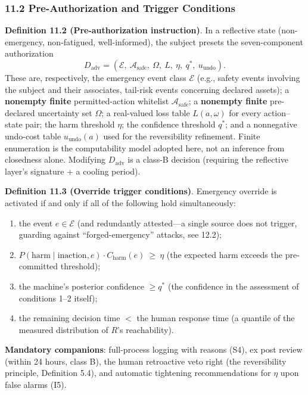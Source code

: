 \documentclass[
  11pt]{article}
\providecommand{\tightlist}{%
  \setlength{\itemsep}{0pt}\setlength{\parskip}{0pt}}
\begin{document}
\subsubsection{11.2 Pre-Authorization and Trigger
Conditions}\label{pre-authorization-and-trigger-conditions}

\textbf{Definition 11.2 (Pre-authorization instruction)}. In a
reflective state (non-emergency, non-fatigued, well-informed), the
subject presets the seven-component authorization
\[D_{\mathrm{adv}} = (\mathcal{E},\ \mathcal{A}_{\mathrm{safe}},\ \Omega,\ L,\ \eta,\ q^*,\ u_{\mathrm{undo}}).\]
These are, respectively, the emergency event class \(\mathcal{E}\)
(e.g., safety events involving the subject and their associates,
tail-risk events concerning declared assets); a \textbf{nonempty finite}
permitted-action whitelist \(\mathcal{A}_{\mathrm{safe}}\); a
\textbf{nonempty finite} pre-declared uncertainty set \(\Omega\); a
real-valued loss table \(L(a,\omega)\) for every action--state pair; the
harm threshold \(\eta\); the confidence threshold \(q^*\); and a
nonnegative undo-cost table \(u_{\mathrm{undo}}(a)\) used for the
reversibility refinement. Finite enumeration is the computability model
adopted here, not an inference from closedness alone. Modifying
\(D_{\mathrm{adv}}\) is a class-B decision (requiring the reflective
layer's signature + a cooling period).

\textbf{Definition 11.3 (Override trigger conditions)}. Emergency
override is activated if and only if all of the following hold
simultaneously:

\begin{enumerate}
\def\labelenumi{\arabic{enumi}.}
\tightlist
\item
  the event \(e \in \mathcal{E}\) (and redundantly attested---a single
  source does not trigger, guarding against ``forged-emergency''
  attacks, see 12.2);
\item
  \(P(\text{harm} \mid \text{inaction}, e) \cdot C_{\mathrm{harm}}(e) \ \ge\ \eta\)
  (the expected harm exceeds the pre-committed threshold);
\item
  the machine's posterior confidence \(\ge q^*\) (the confidence in the
  assessment of conditions 1--2 itself);
\item
  the remaining decision time \(<\) the human response time (a quantile
  of the measured distribution of \(R\)'s reachability).
\end{enumerate}

\textbf{Mandatory companions}: full-process logging with reasons (S4),
ex post review (within 24 hours, class B), the human retroactive veto
right (the reversibility principle, Definition 5.4), and automatic
tightening recommendations for \(\eta\) upon false alarms (I5).
\end{document}
